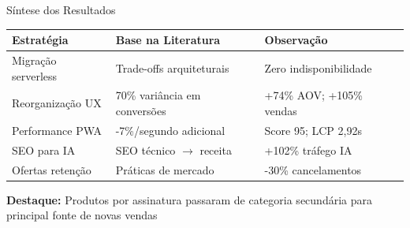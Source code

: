 \documentclass{beamer}
\begin{document}
    \begin{frame}{Síntese dos Resultados}
        \begin{table}[htb]
        \centering
        \small
        \begin{tabular}{p{2.5cm}p{3.5cm}p{4cm}}
        \hline
        \textbf{Estratégia} & \textbf{Base na Literatura} & \textbf{Observação} \\
        \hline
        Migração serverless & Trade-offs arquiteturais & Zero indisponibilidade \\
        \hline
        Reorganização UX & 70\% variância em conversões & +74\% AOV; +105\% vendas \\
        \hline
        Performance PWA & -7\%/segundo adicional & Score 95; LCP 2,92s \\
        \hline
        SEO para IA & SEO técnico $\rightarrow$ receita & +102\% tráfego IA \\
        \hline
        Ofertas retenção & Práticas de mercado & -30\% cancelamentos \\
        \hline
        \end{tabular}
        \end{table}

        \vspace{0.3cm}

        \textbf{Destaque:} Produtos por assinatura passaram de categoria secundária para principal fonte de novas vendas
    \end{frame}
\end{document}
